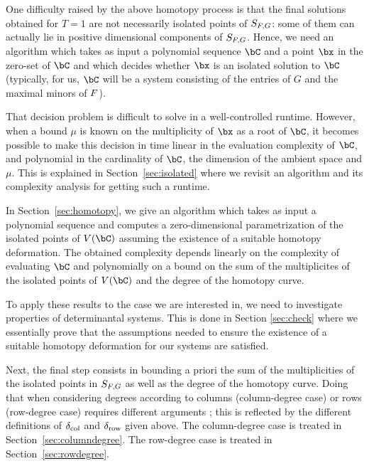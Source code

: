 \documentclass[12pt]{article}
\begin{document}
One difficulty raised by the above homotopy process is that the final
solutions obtained for $T=1$ are not necessarily isolated points of
$S_{{F}, G}$: some of them can actually lie in positive dimensional
components of $S_{{F}, G}$.  Hence, we need an algorithm which takes
as input a polynomial sequence $\bC$ and a point $\bx$ in the zero-set
of $\bC$ and which decides whether $\bx$ is an isolated solution to
$\bC$ (typically, for us, $\bC$ will be a system consisting of the
entries of $G$ and the maximal minors of ${F}$).

That decision problem is difficult to solve in a well-controlled
runtime. However, when a bound $\mu$ is known on the multiplicity of
$\bx$ as a root of $\bC$, it becomes possible to make this decision in
time linear in the evaluation complexity of $\bC$, and polynomial in
the cardinality of $\bC$, the dimension of the ambient space and
$\mu$. This is explained in Section~\ref{sec:isolated} where we
revisit an algorithm and its complexity analysis for getting such a
runtime.

In Section~\ref{sec:homotopy}, we give an algorithm which takes as
input a polynomial sequence and computes a zero-dimensional
parametrization of the isolated points of $V(\bC)$ assuming the
existence of a suitable homotopy deformation. The obtained complexity
depends linearly on the complexity of evaluating $\bC$ and
polynomially on a bound on the sum of the multiplicites of the
isolated points of $V(\bC)$ and the degree of the homotopy curve.

To apply these results to the case we are interested in, we need to
investigate properties of determinantal systems. This is done in
Section \ref{sec:check} where we essentially prove that the
assumptions needed to ensure the existence of a suitable homotopy
deformation for our systems are satisfied. 

Next, the final step consists in bounding a priori the sum of the
multiplicities of the isolated points in $S_{{F}, G}$ as well as the
degree of the homotopy curve. Doing that when considering degrees
according to columns (column-degree case) or rows (row-degree case)
requires different arguments ; this is reflected by the different
definitions of $\delta_{\rm col}$ and $\delta_{\rm row}$ given
above. The column-degree case is treated in
Section~\ref{sec:columndegree}. The row-degree case is treated in
Section~\ref{sec:rowdegree}. 

\end{document}
